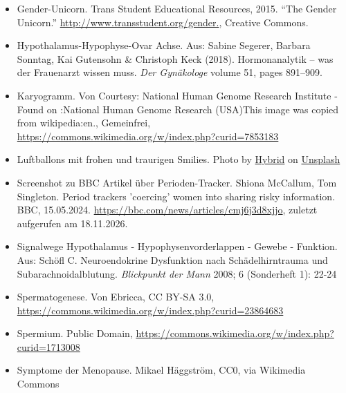 \documentclass{beamer}
\begin{document}
\begin{frame}
\begin{tiny}
\begin{itemize}
\item
Gender-Unicorn. Trans Student Educational Resources, 2015. ``The Gender Unicorn.'' \url{http://www.transstudent.org/gender.}, Creative Commons.



\item
Hypothalamus-Hypophyse-Ovar Achse. Aus:    Sabine Segerer, Barbara Sonntag, Kai Gutensohn \& Christoph Keck (2018). Hormonanalytik – was der Frauenarzt wissen muss. \emph{Der Gynäkologe} volume 51, pages 891–909.

\item
Karyogramm. Von Courtesy: National Human Genome Research Institute - Found on :National Human Genome Research (USA)This image was copied from wikipedia:en., Gemeinfrei, \url{https://commons.wikimedia.org/w/index.php?curid=7853183}


\item
Luftballons mit frohen und traurigen Smilies. Photo by \href{https://unsplash.com/@artbyhybrid?utm_source=unsplash&utm_medium=referral&utm_content=creditCopyText}{Hybrid} on \href{https://unsplash.com/s/photos/feedback?utm_source=unsplash&utm_medium=referral&utm_content=creditCopyText}{Unsplash}

\item 
Screenshot zu BBC Artikel über Perioden-Tracker. Shiona McCallum, Tom Singleton. Period trackers 'coercing' women into sharing risky information. BBC, 15.05.2024. \url{https://bbc.com/news/articles/cmj6j3d8xjjo}, zuletzt aufgerufen am 18.11.2026.

\item
Signalwege Hypothalamus - Hypophysenvorderlappen - Gewebe - Funktion.  Aus: Schöfl C. Neuroendokrine Dysfunktion nach Schädelhirntrauma und Subarachnoidalblutung. \emph{Blickpunkt der Mann} 2008; 6 (Sonderheft 1): 22-24

\item
Spermatogenese. Von Ebricca, CC BY-SA 3.0, \url{https://commons.wikimedia.org/w/index.php?curid=23864683}

\item
Spermium. Public Domain, \url{https://commons.wikimedia.org/w/index.php?curid=1713008}

\item
Symptome der Menopause. Mikael Häggström, CC0, via Wikimedia Commons
\end{itemize}
\end{tiny}
\end{frame}
\end{document}
